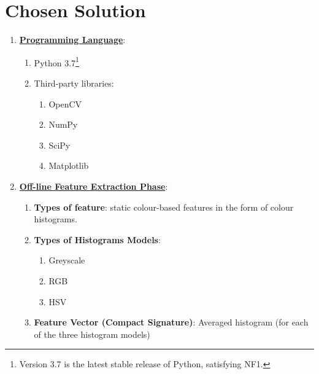 \clearpage
\section{Chosen Solution}

\begin{enumerate}
    \item \underline{\textbf{Programming Language}}: 
    \begin{enumerate}
        \item Python 3.7\footnote{Version 3.7 is the latest stable release of Python, satisfying NF1.}
        \item Third-party libraries:
        \begin{enumerate}
            \item OpenCV
            \item NumPy
            \item SciPy
            \item Matplotlib
        \end{enumerate}
    \end{enumerate}
    
    \item \underline{\textbf{Off-line Feature Extraction Phase}}:
    \begin{enumerate}
        \item \textbf{Types of feature}: static colour-based features in the form of colour histograms.
        \item \textbf{Types of Histograms Models}:
        \begin{enumerate}
            \item Greyscale
            \item RGB
            \item HSV
        \end{enumerate}
        \item \textbf{Feature Vector (Compact Signature)}: Averaged histogram (for each of the three histogram models)
    \end{enumerate}
    

\end{enumerate}
